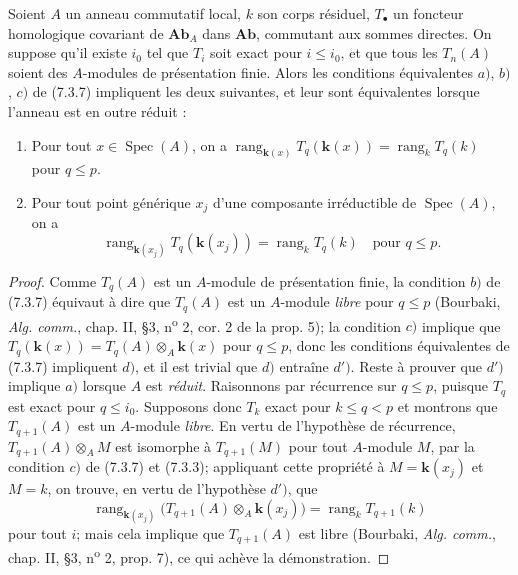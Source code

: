 \begin{proposition}[7.3.11]
Soient $A$ un anneau commutatif local, $k$ son corps résiduel, $T_\bullet$ un
foncteur homologique covariant de $\boldsymbol{Ab}_A$ dans $\boldsymbol{Ab}$,
commutant aux sommes directes. On suppose qu'il existe $i_0$ tel que $T_i$ soit
exact pour $i\leq i_0$, et que tous les $T_n(A)$ soient des $A$-modules de
présentation finie. Alors les conditions équivalentes $a)$, $b)$, $c)$ de
\textup{(7.3.7)} impliquent les deux suivantes, et leur sont équivalentes lorsque
l'anneau est en outre réduit :
\begin{enumerate}
  \item[d)] Pour tout $x\in\operatorname{Spec}(A)$, on a
    $\operatorname{rang}_{\mathbf{k}(x)}T_q(\boldsymbol{k}(x))=\operatorname{rang}_kT_q(k)$
    pour $q\leq p$.
  \item[$d'$)] Pour tout point générique $x_j$ d'une composante irréductible
    de $\operatorname{Spec}(A)$, on a
    \[
      \operatorname{rang}_{\mathbf{k}(x_j)}T_q(\boldsymbol{k}(x_j))
      =
      \operatorname{rang}_kT_q(k)
      \quad\text{pour }q\leq p.
    \]
\end{enumerate}
\end{proposition}

\begin{proof}
Comme $T_q(A)$ est un $A$-module de présentation finie, la condition $b)$ de
(7.3.7) équivaut à dire que $T_q(A)$ est un $A$-module \emph{libre} pour $q\leq p$
(Bourbaki, \emph{Alg. comm.}, chap. II, \S 3, n\textsuperscript{o} 2, cor. 2
de la prop. 5); la condition $c)$ implique que
$T_q(\boldsymbol{k}(x))=T_q(A)\otimes_A\boldsymbol{k}(x)$ pour $q\leq p$,
donc les conditions équivalentes de (7.3.7) impliquent $d)$, et il est trivial
que $d)$ entraîne $d')$. Reste à prouver que $d')$ implique $a)$ lorsque $A$
est \emph{réduit}. Raisonnons par récurrence sur $q\leq p$, puisque $T_q$ est exact
pour $q\leq i_0$. Supposons donc $T_k$ exact pour $k\leq q<p$ et montrons que
$T_{q+1}(A)$ est un $A$-module \emph{libre}. En vertu de l'hypothèse de récurrence,
$T_{q+1}(A)\otimes_A M$ est isomorphe à $T_{q+1}(M)$ pour tout $A$-module $M$,
par la condition $c)$ de (7.3.7) et (7.3.3); appliquant cette propriété à
$M=\boldsymbol{k}(x_j)$ et $M=k$, on trouve, en vertu de l'hypothèse $d')$, que
\[
  \operatorname{rang}_{\mathbf{k}(x_j)}
  \bigl(T_{q+1}(A)\otimes_A\boldsymbol{k}(x_j)\bigr)
  =
  \operatorname{rang}_kT_{q+1}(k)
\]
pour tout $i$; mais cela implique que $T_{q+1}(A)$ est libre (Bourbaki,
\emph{Alg. comm.}, chap. II, \S 3, n\textsuperscript{o} 2, prop. 7), ce qui
achève la démonstration.
\end{proof}

